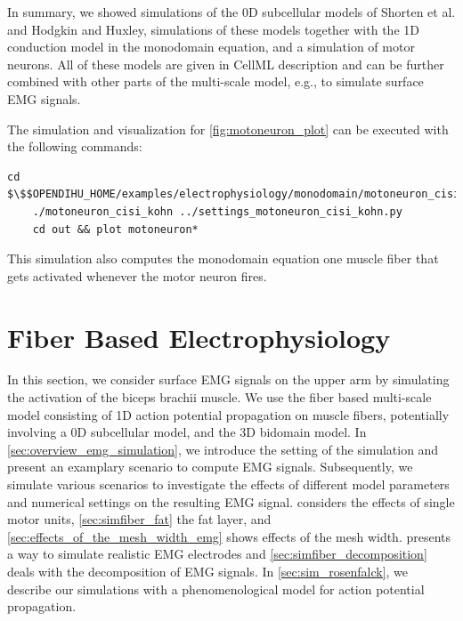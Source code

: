 In summary, we showed simulations of the 0D subcellular models of Shorten et al. and Hodgkin and Huxley, simulations of these models together with the 1D conduction model in the monodomain equation, and a simulation of motor neurons. All of these models are given in CellML description and can be further combined with other parts of the multi-scale model, e.g., to simulate surface EMG signals.

\begin{reproduce_no_break}
  The simulation and visualization for \cref{fig:motoneuron_plot} can be executed with the following commands:
  \begin{lstlisting}[columns=fullflexible,breaklines=true,postbreak=\mbox{\textcolor{gray}{$\hookrightarrow$}\space}]
    cd $\$$OPENDIHU_HOME/examples/electrophysiology/monodomain/motoneuron_cisi_kohn/build_release
    ./motoneuron_cisi_kohn ../settings_motoneuron_cisi_kohn.py
    cd out && plot motoneuron*
  \end{lstlisting}
  This simulation also computes the monodomain equation one muscle fiber that gets activated whenever the motor neuron fires.
\end{reproduce_no_break}



\section{Fiber Based Electrophysiology}\label{sec:results_fiber_based_electrophysiology}

In this section, we consider surface EMG signals on the upper arm by simulating the activation of the biceps brachii muscle. We use the fiber based multi-scale model consisting of 1D action potential propagation on muscle fibers, potentially involving a 0D subcellular model, and the 3D bidomain model.
In \cref{sec:overview_emg_simulation}, we introduce the setting of the simulation and present an examplary scenario to compute EMG signals.
Subsequently, we simulate various scenarios to investigate the effects of different model parameters and numerical settings on the resulting EMG signal.  considers the effects of single motor units, \cref{sec:simfiber_fat} the fat layer, and \cref{sec:effects_of_the_mesh_width_emg} shows effects of the mesh width.  presents a way to simulate realistic EMG electrodes and \cref{sec:simfiber_decomposition} deals with the decomposition of EMG signals.
In \cref{sec:sim_rosenfalck}, we describe our simulations with a phenomenological model for action potential propagation.

